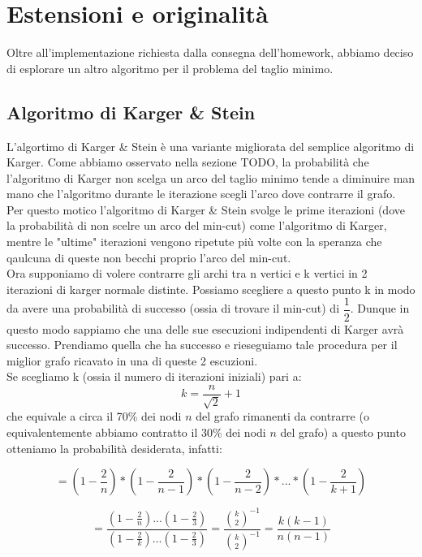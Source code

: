 \section{Estensioni e originalità}
\label{cap:extensions-and-originalities}

\noindent Oltre all'implementazione richiesta dalla consegna
dell'homework, abbiamo deciso di esplorare un altro algoritmo per il problema del taglio minimo.

\subsection{Algoritmo di Karger \& Stein}
\label{sub:karger-stein-algorithm}

L'algortimo di Karger \& Stein è una variante migliorata del semplice algoritmo di Karger. Come abbiamo osservato nella sezione TODO, la probabilità che l'algoritmo di Karger non scelga un arco del taglio minimo tende a diminuire man mano che l'algoritmo durante le iterazione scegli l'arco dove contrarre il grafo. Per questo motico l'algoritmo di Karger \& Stein svolge le prime iterazioni (dove la probabilità di non scelre un arco del min-cut) come l'algoritmo di Karger, mentre le "ultime" iterazioni vengono ripetute più volte con la speranza che qaulcuna di queste non becchi proprio l'arco del min-cut. \\

\noindent Ora supponiamo di volere contrarre gli archi tra n vertici e k vertici in 2 iterazioni di karger normale distinte. Possiamo scegliere a questo punto k in modo da avere una probabilità di successo (ossia di trovare il min-cut) di $\dfrac{1}{2}$. Dunque in questo modo sappiamo che una delle sue esecuzioni indipendenti di Karger avrà successo. Prendiamo quella che ha successo e rieseguiamo tale procedura per il miglior grafo ricavato in una di queste 2 escuzioni. \\

\noindent Se scegliamo k (ossia il numero di iterazioni iniziali) pari a:
$$ k = \dfrac{n}{\sqrt{2}} + 1$$
che equivale a circa il 70\% dei nodi $n$ del grafo rimanenti da contrarre (o equivalentemente abbiamo contratto il 30\% dei nodi $n$ del grafo) a questo punto otteniamo la probabilità desiderata, infatti:

$$ = (1 - \frac{2}{n}) * (1 - \frac{2}{n-1}) * (1 - \frac{2}{n-2}) * ... * (1 - \frac{2}{k+1}) $$

$$ = \dfrac{(1 - \frac{2}{n}) ... (1 - \frac{2}{3})}{(1 - \frac{2}{k}) ... (1 - \frac{2}{3})} = \dfrac{{k\choose 2}^{-1}} {{k\choose 2}^{-1}} = \dfrac{k(k-1)}{n(n-1)}$$

